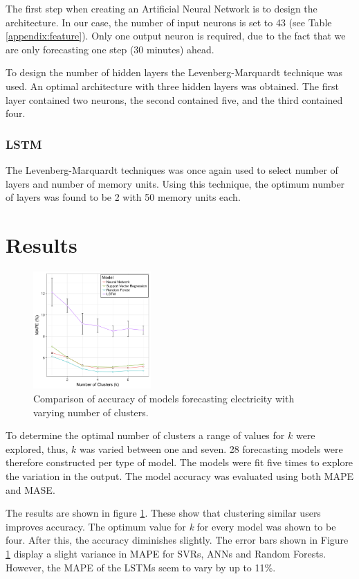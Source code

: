 The first step when creating an Artificial Neural Network is to design the architecture. In our case, the number of input neurons is set to 43 (see Table \ref{appendix:feature}). Only one output neuron is required, due to the fact that we are only forecasting one step (30 minutes) ahead.

To design the number of hidden layers the Levenberg-Marquardt technique was used. An optimal architecture with three hidden layers was obtained. The first layer contained two neurons, the second contained five, and the third contained four.

\subsubsection{LSTM}

The Levenberg-Marquardt techniques was once again used to select number of layers and number of memory units. Using this technique, the optimum number of layers was found to be 2 with 50 memory units each.

\section{Results}
\begin{figure}
	\includegraphics[width=0.4\textwidth]{figures/results.png}
	\caption{Comparison of accuracy of models forecasting electricity with varying number of clusters.}
	\label{fig:results}
\end{figure}
To determine the optimal number of clusters a range of values for $k$ were explored, thus, $k$ was varied between one and seven. 28 forecasting models were therefore constructed per type of model. The models were fit five times to explore the variation in the output. The model accuracy was evaluated using both MAPE and MASE.

The results are shown in figure \ref{fig:results}. These show that clustering similar users improves accuracy. The optimum value for \textit{k} for every model was shown to be four. After this, the accuracy diminishes slightly. The error bars shown in Figure \ref{fig:results} display a slight variance in MAPE for SVRs, ANNs and Random Forests. However, the MAPE of the LSTMs seem to vary by up to 11\%. 

